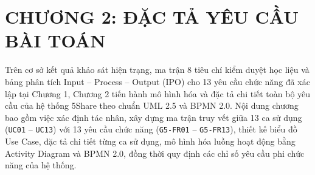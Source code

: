 \section{CHƯƠNG 2: ĐẶC TẢ YÊU CẦU BÀI TOÁN}

\noindent Trên cơ sở kết quả khảo sát hiện trạng, ma trận 8 tiêu chí kiểm duyệt học liệu và bảng phân tích Input -- Process -- Output (IPO) cho 13 yêu cầu chức năng đã xác lập tại Chương 1, Chương 2 tiến hành mô hình hóa và đặc tả chi tiết toàn bộ yêu cầu của hệ thống 5Share theo chuẩn UML 2.5 và BPMN 2.0. Nội dung chương bao gồm việc xác định tác nhân, xây dựng ma trận truy vết giữa 13 ca sử dụng (\texttt{UC01} -- \texttt{UC13}) với 13 yêu cầu chức năng (\texttt{G5-FR01} -- \texttt{G5-FR13}), thiết kế biểu đồ Use Case, đặc tả chi tiết từng ca sử dụng, mô hình hóa luồng hoạt động bằng Activity Diagram và BPMN 2.0, đồng thời quy định các chỉ số yêu cầu phi chức năng của hệ thống.

\vspace{0.3cm}

\newpage

\newpage

\newpage

\newpage

